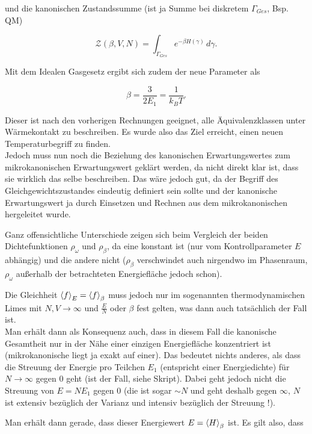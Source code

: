 \documentclass[../KlassMech_main.tex]{subfiles}
\begin{document}
und die kanonischen Zustandssumme (ist ja Summe bei diskretem $\Gamma_{Ges}$, Bsp. QM)

\begin{equation}
\mathcal{Z}(\beta, V, N) = \int_{\Gamma_{Ges}} e^{-\beta H(\gamma)} \, d\gamma .
\end{equation}

Mit dem Idealen Gasgesetz ergibt sich zudem der neue Parameter als

\begin{equation}
\beta = \frac{3}{2 E_1} = \frac{1}{k_B T} .
\end{equation}

Dieser ist nach den vorherigen Rechnungen geeignet, alle Äquivalenzklassen unter Wärmekontakt zu beschreiben. Es wurde also das Ziel erreicht, einen neuen Temperaturbegriff zu finden.\\
Jedoch muss nun noch die Beziehung des kanonischen Erwartungswertes zum mikrokanonischen Erwartungswert geklärt werden, da nicht direkt klar ist, dass sie wirklich das selbe beschreiben. Das wäre jedoch gut, da der Begriff des Gleichgewichtszustandes eindeutig definiert sein sollte und der kanonische Erwartungswert ja durch Einsetzen und Rechnen aus dem mikrokanonischen hergeleitet wurde.

Ganz offensichtliche Unterschiede zeigen sich beim Vergleich der beiden Dichtefunktionen $\rho_\omega$ und $\rho_\beta$, da eine konstant ist (nur vom Kontrollparameter $E$ abhängig) und die andere nicht ($\rho_\beta$ verschwindet auch nirgendwo im Phasenraum, $\rho_\omega$ außerhalb der betrachteten Energiefläche jedoch schon).

Die Gleichheit $\expval{f}_E = \expval{f}_\beta$ muss jedoch nur im sogenannten thermodynamischen Limes mit $N, V \rightarrow \infty$ und $\frac{E}{N}$ oder $\beta$ fest gelten, was dann auch tatsächlich der Fall ist.\\
Man erhält dann als Konsequenz auch, dass in diesem Fall die kanonische Gesamtheit nur in der Nähe einer einzigen Energiefläche konzentriert ist (mikrokanonische liegt ja exakt auf einer). Das bedeutet nichts anderes, als dass die Streuung der Energie pro Teilchen $E_1$ (entspricht einer Energiedichte) für $N \rightarrow \infty$ gegen $0$ geht (ist der Fall, siehe Skript). Dabei geht jedoch nicht die Streuung von $E = N E_1$ gegen $0$ (die ist sogar $\sim N$ und geht deshalb gegen $\infty$, $N$ ist extensiv bezüglich der Varianz und intensiv bezüglich der Streuung !).

Man erhält dann gerade, dass dieser Energiewert $E = \expval{H}_\beta$ ist. Es gilt also, dass
\end{document}
